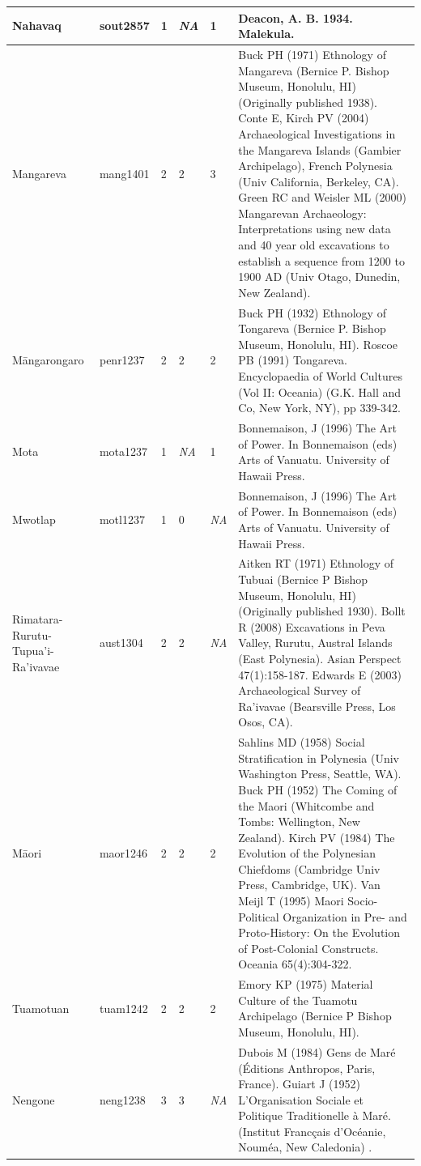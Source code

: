 \documentclass[a4paper,10pt]{article} %
\begin{document}
\begin{landscape}
\begin{longtable}{ | p{2cm}| p{2cm}| p{1.8cm}| p{1.8cm}| p{3cm}| p{9cm}| }
Nahavaq&sout2857&1&\emph{NA}&1&Deacon, A. B. 1934. Malekula.\\ \hline
Mangareva&mang1401&2&2&3&Buck PH (1971) Ethnology of Mangareva (Bernice P. Bishop Museum, Honolulu, HI) (Originally published 1938). Conte E, Kirch PV (2004) Archaeological Investigations in the Mangareva Islands (Gambier Archipelago), French Polynesia (Univ California, Berkeley, CA). Green RC and Weisler ML (2000) Mangarevan Archaeology: Interpretations using new data and 40 year old excavations to establish a sequence from 1200 to 1900 AD (Univ Otago, Dunedin, New Zealand). \\ \hline
Māngarongaro&penr1237&2&2&2&Buck PH (1932) Ethnology of Tongareva (Bernice P. Bishop Museum, Honolulu, HI). Roscoe PB (1991) Tongareva. Encyclopaedia of World Cultures (Vol II: Oceania) (G.K. Hall and Co, New York, NY), pp 339-342. \\ \hline
Mota&mota1237&1&\emph{NA}&1&Bonnemaison, J (1996) The Art of Power. In Bonnemaison (eds) Arts of Vanuatu. University of Hawaii Press.\\ \hline
Mwotlap&motl1237&1&0&\emph{NA}&Bonnemaison, J (1996) The Art of Power. In Bonnemaison (eds) Arts of Vanuatu. University of Hawaii Press.\\ \hline
﻿Rimatara-Rurutu-Tupua'i-Ra'ivavae&aust1304&2&2&\emph{NA}&Aitken RT (1971) Ethnology of Tubuai (Bernice P Bishop Museum, Honolulu, HI) (Originally published 1930). Bollt R (2008) Excavations in Peva Valley, Rurutu, Austral Islands (East Polynesia). Asian Perspect 47(1):158-187. Edwards E (2003) Archaeological Survey of Ra’ivavae (Bearsville Press, Los Osos, CA). \\ \hline
Māori&maor1246&2&2&2&Sahlins MD (1958) Social Stratification in Polynesia (Univ Washington Press, Seattle, WA). Buck PH (1952) The Coming of the Maori (Whitcombe and Tombs: Wellington, New Zealand). Kirch PV (1984) The Evolution of the Polynesian Chiefdoms (Cambridge Univ Press, Cambridge, UK). Van Meijl T (1995) Maori Socio-Political Organization in Pre- and Proto-History: On the Evolution of Post-Colonial Constructs. Oceania 65(4):304-322. \\ \hline
Tuamotuan&tuam1242&2&2&2&Emory KP (1975) Material Culture of the Tuamotu Archipelago (Bernice P Bishop Museum, Honolulu, HI).\\ \hline
Nengone&neng1238&3&3&\emph{NA}&﻿Dubois M (1984) Gens de Mar\'{e} (\'{E}ditions Anthropos, Paris, France). Guiart J (1952) L'Organisation Sociale et Politique Traditionelle \`{a} Mar\'{e}. (Institut Franc{\c c}ais d'Oc\'{e}anie, Noum\'{e}a, New Caledonia) . \\ \hline

\end{longtable}
\end{landscape}
\end{document}
